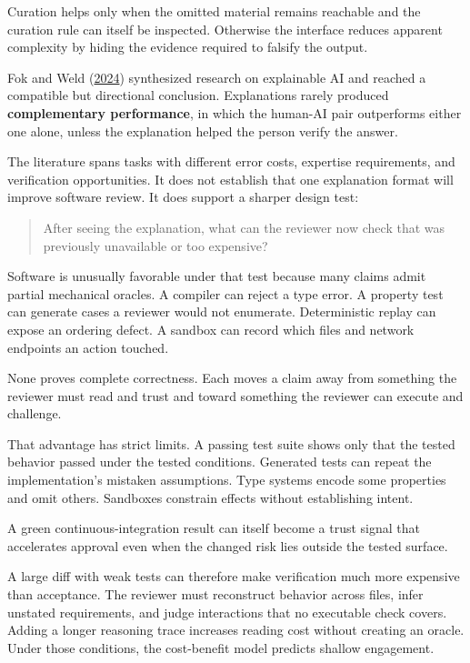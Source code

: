 Curation helps only when the omitted material remains reachable and the curation rule can itself be inspected. Otherwise the interface reduces apparent complexity by hiding the evidence required to falsify the output.

Fok and Weld (\href{https://arxiv.org/abs/2305.07722}{2024}) synthesized research on explainable AI and reached a compatible but directional conclusion. Explanations rarely produced \textbf{complementary performance}, in which the human-AI pair outperforms either one alone, unless the explanation helped the person verify the answer.

The literature spans tasks with different error costs, expertise requirements, and verification opportunities. It does not establish that one explanation format will improve software review. It does support a sharper design test:

\begin{quote}
After seeing the explanation, what can the reviewer now check that was previously unavailable or too expensive?
\end{quote}

Software is unusually favorable under that test because many claims admit partial mechanical oracles. A compiler can reject a type error. A property test can generate cases a reviewer would not enumerate. Deterministic replay can expose an ordering defect. A sandbox can record which files and network endpoints an action touched.

None proves complete correctness. Each moves a claim away from something the reviewer must read and trust and toward something the reviewer can execute and challenge.

That advantage has strict limits. A passing test suite shows only that the tested behavior passed under the tested conditions. Generated tests can repeat the implementation's mistaken assumptions. Type systems encode some properties and omit others. Sandboxes constrain effects without establishing intent.

A green continuous-integration result can itself become a trust signal that accelerates approval even when the changed risk lies outside the tested surface.

A large diff with weak tests can therefore make verification much more expensive than acceptance. The reviewer must reconstruct behavior across files, infer unstated requirements, and judge interactions that no executable check covers. Adding a longer reasoning trace increases reading cost without creating an oracle. Under those conditions, the cost-benefit model predicts shallow engagement.

